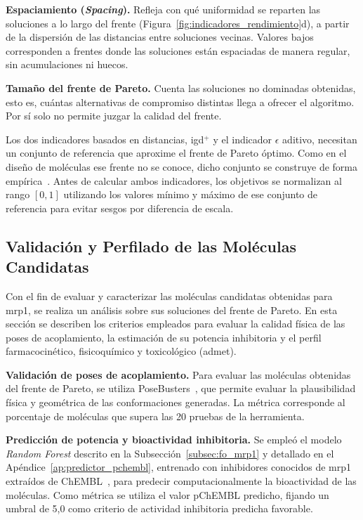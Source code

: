 \textbf{Espaciamiento (\textit{Spacing}).} Refleja con qué uniformidad se reparten las soluciones a lo largo del frente (Figura~\ref{fig:indicadores_rendimiento}d), a partir de la dispersión de las distancias entre soluciones vecinas. Valores bajos corresponden a frentes donde las soluciones están espaciadas de manera regular, sin acumulaciones ni huecos.

\textbf{Tamaño del frente de Pareto.} Cuenta las soluciones no dominadas obtenidas, esto es, cuántas alternativas de compromiso distintas llega a ofrecer el algoritmo. Por sí solo no permite juzgar la calidad del frente.



Los dos indicadores basados en distancias, \acrshort{igd}$^+$ y el indicador $\epsilon$ aditivo, necesitan un conjunto de referencia que aproxime el frente de Pareto óptimo. Como en el diseño de moléculas ese frente no se conoce, dicho conjunto se construye de forma empírica~\cite{liyao2019quality}. Antes de calcular ambos indicadores, los objetivos se normalizan al rango $[0, 1]$ utilizando los valores mínimo y máximo de ese conjunto de referencia para evitar sesgos por diferencia de escala.

\subsection{Validación y Perfilado de las Moléculas Candidatas}
\label{subsec:validacion_perfilado_candidatos}

Con el fin de evaluar y caracterizar las moléculas candidatas obtenidas para \gls{mrp1}, se realiza un análisis sobre sus soluciones del frente de Pareto. En esta sección se describen los criterios empleados para evaluar la calidad física de las poses de acoplamiento, la estimación de su potencia inhibitoria y el perfil farmacocinético, fisicoquímico y toxicológico (\gls{admet}).

\textbf{Validación de poses de acoplamiento.} Para evaluar las moléculas obtenidas del frente de Pareto, se utiliza PoseBusters~\cite{buttenschoen2024posebusters}, que permite evaluar la plausibilidad física y geométrica de las conformaciones generadas. La métrica corresponde al porcentaje de moléculas que supera las 20 pruebas de la herramienta.

\textbf{Predicción de potencia y bioactividad inhibitoria.} Se empleó el modelo \textit{Random Forest} descrito en la Subsección~\ref{subsec:fo_mrp1} y detallado en el Apéndice~\ref{ap:predictor_pchembl}, entrenado con inhibidores conocidos de \gls{mrp1} extraídos de ChEMBL~\cite{mendez2019chembl}, para predecir computacionalmente la bioactividad de las moléculas. Como métrica se utiliza el valor pChEMBL predicho, fijando un umbral de 5,0 como criterio de actividad inhibitoria predicha favorable.

